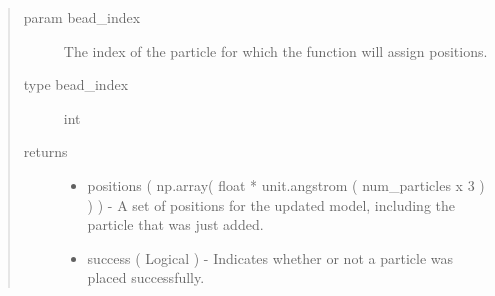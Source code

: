 \documentclass[letterpaper,12pt,english,openany,oneside]{sphinxmanual}
\begin{document}
\begin{fulllineitems}
\begin{description}
\begin{quote}
\begin{description}
\item[{param bead\_index}] \leavevmode
The index of the particle for which the function will assign positions.

\item[{type bead\_index}] \leavevmode
int

\item[{returns}] \leavevmode\begin{itemize}
\item {} 
positions ( np.array( float * unit.angstrom ( num\_particles x 3 ) ) ) - A set of positions for the updated model, including the particle that was just added.

\item {} 
success ( Logical ) - Indicates whether or not a particle was placed successfully.

\end{itemize}

\end{description}\end{quote}

\end{description}

\end{fulllineitems}

\end{document}
